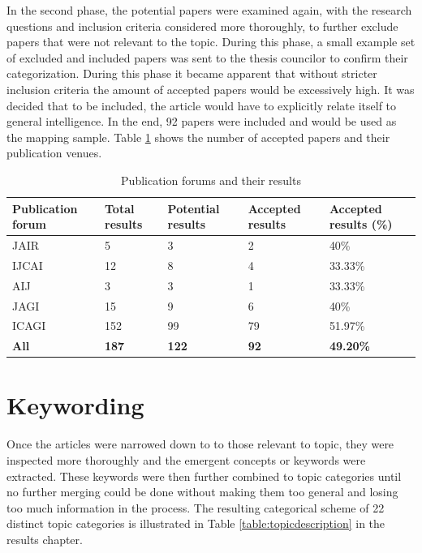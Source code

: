 \documentclass[utf8,english]{gradu3}
\begin{document}
In the second phase, the potential papers were examined again, with the research
questions and inclusion criteria considered more thoroughly, to further exclude
papers that were not relevant to the topic. During this phase, a small example
set of excluded and included papers was sent to the thesis councilor to confirm
their categorization. During this phase it became apparent that without stricter
inclusion criteria the amount of accepted papers would be excessively high. It
was decided that to be included, the article would have to explicitly relate
itself to general intelligence. In the end, 92 papers were included and would be
used as the mapping sample. Table \ref*{table:forumtable} shows the number of accepted
papers and their publication venues.



  \clearpage
  \begin{table}[h]
    \centering
    \begin{tabular}{|l|l|l|l|l|}
      \hline
      \textbf{Publication forum}  & \textbf{Total results} & \textbf{Potential results} & \textbf{Accepted results} & \textbf{Accepted results (\%)} \\ \hline
      JAIR   & 5   & 3  & 2  & 40\%  \\ \hline
      IJCAI  & 12  & 8  & 4  & 33.33\%  \\ \hline
      AIJ    & 3   & 3  & 1   & 33.33\%  \\ \hline
      JAGI   & 15  & 9  & 6   & 40\%  \\ \hline
      ICAGI  & 152 & 99 & 79  & 51.97\%  \\ \hline
      \textbf{All} & \textbf{187} & \textbf{122}  & \textbf{92}  & \textbf{49.20\%}  \\ \hline
    \end{tabular}
    \caption{Publication forums and their results}
    \label{table:forumtable}
  \end{table}

\section{Keywording}
Once the articles were narrowed down to to those relevant to topic, they were
inspected more thoroughly and the emergent concepts or keywords were extracted.
These keywords were then further combined to topic categories until no further
merging could be done without making them too general and losing too much
information in the process. The resulting categorical scheme of 22 distinct
topic categories is illustrated in Table \ref{table:topicdescription} in the
results chapter.  
\end{document}
